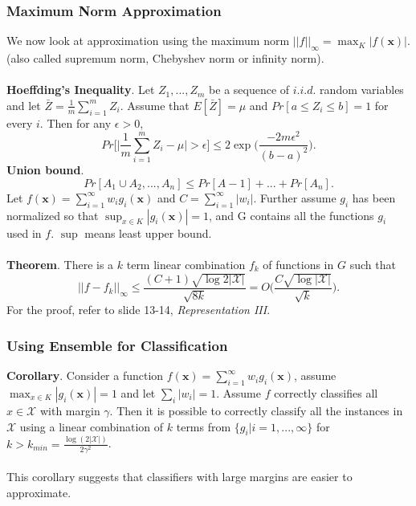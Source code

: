 \documentclass{article}
\begin{document}
   \subsubsection{Maximum Norm Approximation}
   We now look at approximation using the maximum norm $||f||_\infty = \max_K |f(\mathbf{x})|$. (also called supremum norm, Chebyshev norm or infinity norm).
   \\\\
   \textbf{Hoeffding's Inequality}. Let $Z_1,...,Z_m$ be a sequence of $i.i.d.$ random variables and let $\bar{Z} = \frac{1}{m}\sum_{i=1}^m Z_i$. Assume that $E[\bar{Z}] = \mu$ and $Pr[a \leq Z_i \leq b] = 1$ for every $i$. Then for any $\epsilon > 0$,
   \begin{equation}
   Pr\Bigg[ \Bigg| \frac{1}{m}\sum_{i=1}^m Z_i - \mu \Bigg| > \epsilon \Bigg] \leq 2\exp\Bigg(\frac{-2m\epsilon^2}{(b-a)^2}\Bigg).
   \end{equation}
   \textbf{Union bound}.
   \begin{equation}
   Pr[A_1 \cup A_2,...,A_n] \leq Pr[A-1] + ... + Pr[A_n].
   \end{equation}
   Let $f(\mathbf{x})=\sum_{i=1}^{\infty} w_ig_i(\mathbf{x})$ and $C = \sum_{i=1}^{\infty} |w_i|$. Further assume $g_i$ has been normalized so that $\sup_{x\in K} |g_i(\mathbf{x})| = 1$, and G contains all the functions $g_i$ used in $f$. $\sup$ means least upper bound.
   \\\\
   \textbf{Theorem}. There is a $k$ term linear combination $f_k$ of functions in $G$ such that 
   \begin{equation}
   ||f-f_k||_\infty \leq \frac{(C+1)\sqrt{\log 2|\mathcal{X}|}}{\sqrt{8k}} = O \Bigg( \frac{C\sqrt{\log |\mathcal{X}|}}{\sqrt{k}} \Bigg).
   \end{equation}
   For the proof, refer to slide 13-14, \textit{Representation III}.
   
   \subsubsection{Using Ensemble for Classification}
   \textbf{Corollary}. Consider a function $f(\mathbf{x})=\sum_{i=1}^{\infty} w_ig_i(\mathbf{x})$, assume $\max_{x\in K} |g_i(\mathbf{x})| = 1$ and let $\sum_i |w_i| = 1$. Assume $f$ correctly classifies all $x \in \mathcal{X}$ with margin $\gamma$. Then it is possible to correctly classify all the instances in $\mathcal{X}$ using a linear combination of $k$ terms from $\{ g_i | i=1,...,\infty \}$ for $k > k_{min} = \frac{\log(2|\mathcal{X}|)}{2\gamma^2}$.
   \\\\
   This corollary suggests that classifiers with large margins are easier to approximate.
   
\end{document}
